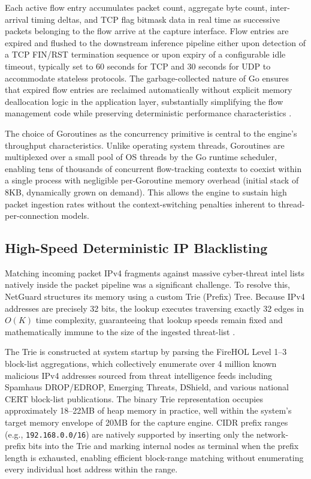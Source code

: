 \documentclass[conference]{IEEEtran}
\begin{document}
Each active flow entry accumulates packet count, aggregate byte count, inter-arrival timing deltas, and TCP flag bitmask data in real time as successive packets belonging to the flow arrive at the capture interface. Flow entries are expired and flushed to the downstream inference pipeline either upon detection of a TCP FIN/RST termination sequence or upon expiry of a configurable idle timeout, typically set to 60 seconds for TCP and 30 seconds for UDP to accommodate stateless protocols. The garbage-collected nature of Go ensures that expired flow entries are reclaimed automatically without explicit memory deallocation logic in the application layer, substantially simplifying the flow management code while preserving deterministic performance characteristics \cite{golang2009}.

The choice of Goroutines as the concurrency primitive is central to the engine's throughput characteristics. Unlike operating system threads, Goroutines are multiplexed over a small pool of OS threads by the Go runtime scheduler, enabling tens of thousands of concurrent flow-tracking contexts to coexist within a single process with negligible per-Goroutine memory overhead (initial stack of 8KB, dynamically grown on demand). This allows the engine to sustain high packet ingestion rates without the context-switching penalties inherent to thread-per-connection models.

\subsection{High-Speed Deterministic IP Blacklisting}
Matching incoming packet IPv4 fragments against massive cyber-threat intel lists natively inside the packet pipeline was a significant challenge. To resolve this, NetGuard structures its memory using a custom Trie (Prefix) Tree. Because IPv4 addresses are precisely 32 bits, the lookup executes traversing exactly 32 edges in $O(K)$ time complexity, guaranteeing that lookup speeds remain fixed and mathematically immune to the size of the ingested threat-list \cite{firehol}.

The Trie is constructed at system startup by parsing the FireHOL Level 1--3 block-list aggregations, which collectively enumerate over 4 million known malicious IPv4 addresses sourced from threat intelligence feeds including Spamhaus DROP/EDROP, Emerging Threats, DShield, and various national CERT block-list publications. The binary Trie representation occupies approximately 18--22MB of heap memory in practice, well within the system's target memory envelope of 20MB for the capture engine. CIDR prefix ranges (e.g., \texttt{192.168.0.0/16}) are natively supported by inserting only the network-prefix bits into the Trie and marking internal nodes as terminal when the prefix length is exhausted, enabling efficient block-range matching without enumerating every individual host address within the range.
\end{document}
